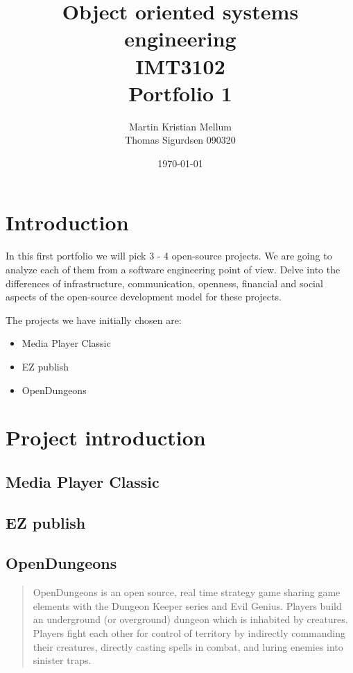 \documentclass{article} %
\title{Object oriented systems engineering \\ IMT3102 \\ Portfolio 1}
\author{Martin Kristian Mellum  \\ Thomas Sigurdsen 090320} %
\date{\today}
\begin{document}
\maketitle       %
\tableofcontents %
\pagebreak	%

\section{Introduction} %
In this first portfolio we will pick 3 - 4 open-source projects. We are going to analyze each of them from a software engineering point of view. Delve into the differences of infrastructure, communication, openness, financial and social aspects of the open-source development model for these projects.

The projects we have initially chosen are:
\begin{itemize}
\item Media Player Classic
\item EZ publish
\item OpenDungeons %
\end{itemize}

\section{Project introduction}
\subsection{Media Player Classic}
\subsection{EZ publish}
\subsection{OpenDungeons}
\begin{quotation}
OpenDungeons is an open source, real time strategy game sharing game elements with the Dungeon Keeper series and Evil Genius. Players build an underground (or overground) dungeon which is inhabited by creatures. Players fight each other for control of territory by indirectly commanding their creatures, directly casting spells in combat, and luring enemies into sinister traps.\cite{odwebabout}
\end{quotation}
\end{document}
